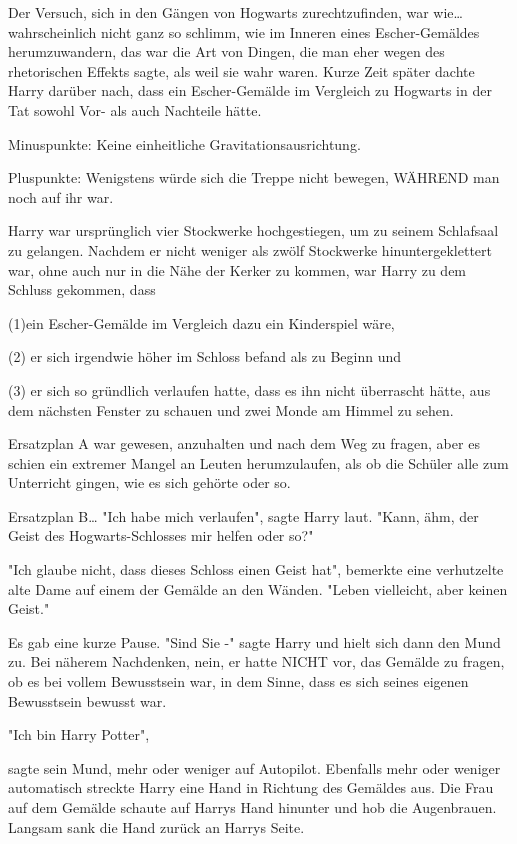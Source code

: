 {Der Versuch, sich in den Gängen von Hogwarts zurechtzufinden, war wie… wahrscheinlich nicht ganz so schlimm, wie im Inneren eines Escher-Gemäldes herumzuwandern, das war die Art von Dingen, die man eher wegen des rhetorischen Effekts sagte, als weil sie wahr waren. Kurze Zeit später dachte Harry darüber nach, dass ein Escher-Gemälde im Vergleich zu Hogwarts in der Tat sowohl Vor- als auch Nachteile hätte.

Minuspunkte: Keine einheitliche Gravitationsausrichtung.

Pluspunkte: Wenigstens würde sich die Treppe nicht bewegen, WÄHREND man noch auf ihr war.

Harry war ursprünglich vier Stockwerke hochgestiegen, um zu seinem Schlafsaal zu gelangen. Nachdem er nicht weniger als zwölf Stockwerke hinuntergeklettert war, ohne auch nur in die Nähe der Kerker zu kommen, war Harry zu dem Schluss gekommen, dass

(1)ein Escher-Gemälde im Vergleich dazu ein Kinderspiel wäre,

(2) er sich irgendwie höher im Schloss befand als zu Beginn und

(3) er sich so gründlich verlaufen hatte, dass es ihn nicht überrascht hätte, aus dem nächsten Fenster zu schauen und zwei Monde am Himmel zu sehen.

Ersatzplan A war gewesen, anzuhalten und nach dem Weg zu fragen, aber es schien ein extremer Mangel an Leuten herumzulaufen, als ob die Schüler alle zum Unterricht gingen, wie es sich gehörte oder so.

Ersatzplan B… "Ich habe mich verlaufen", sagte Harry laut. "Kann, ähm, der Geist des Hogwarts-Schlosses mir helfen oder so?"

"Ich glaube nicht, dass dieses Schloss einen Geist hat", bemerkte eine verhutzelte alte Dame auf einem der Gemälde an den Wänden. "Leben vielleicht, aber keinen Geist."

Es gab eine kurze Pause. "Sind Sie -" sagte Harry und hielt sich dann den Mund zu. Bei näherem Nachdenken, nein, er hatte NICHT vor, das Gemälde zu fragen, ob es bei vollem Bewusstsein war, in dem Sinne, dass es sich seines eigenen Bewusstsein bewusst war.

"Ich bin Harry Potter",

sagte sein Mund, mehr oder weniger auf Autopilot. Ebenfalls mehr oder weniger automatisch streckte Harry eine Hand in Richtung des Gemäldes aus. Die Frau auf dem Gemälde schaute auf Harrys Hand hinunter und hob die Augenbrauen. Langsam sank die Hand zurück an Harrys Seite.

}
